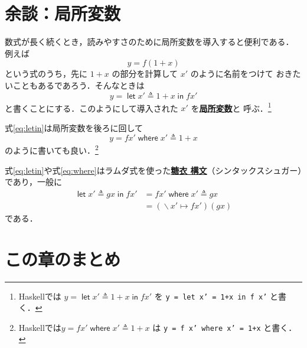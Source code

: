 \documentclass[a5paper,twoside,fleqn,draft]{jsbook}
\newcommand{\programminglanguage}[1]{\textsf{#1}}
\newcommand{\haskell}{\programminglanguage{Haskell}}
\newcommand{\keyword}[1]{{\underline{\textbf{#1}}}}
\newcommand{\code}[1]{\texttt{#1}}
\newcommand{\mKeyword}[1]{\mathsf{#1}}
\newcommand{\mIfKeyword}{\mKeyword{if}}
\newcommand{\mInKeyword}{\mKeyword{in}}
\newcommand{\mLetKeyword}{\mKeyword{let}}
\newcommand{\mOtherwiseKeyword}{\mKeyword{otherwise}}
\newcommand{\mWhereKeyword}{\mKeyword{where}}
\DeclareMathOperator{\mIf}{\mIfKeyword}
\DeclareMathOperator{\mLet}{\mLetKeyword}
\DeclareMathOperator{\mLetIn}{\mInKeyword}
\DeclareMathOperator{\mOtherwise}{\mOtherwiseKeyword}
\DeclareMathOperator{\mWhere}{\mWhereKeyword}
\DeclareMathOperator{\mLambda}{\backslash}
\DeclareMathOperator{\mLambdaArrow}{\mapsto}
\DeclareMathOperator{\mLetEq}{\triangleq}
\DeclareMathOperator{\mWhereEq}{\mLetEq}
\begin{document}

\section{余談：局所変数}

数式が長く続くとき，読みやすさのために局所変数を導入すると便利である．
例えば
\begin{equation}
  y
  =f(1+x)
\end{equation}
という式のうち，先に $1+x$ の部分を計算して $x'$ のように名前をつけて
おきたいこともあるであろう．そんなときは
\begin{equation}
  \label{eq:letin}
  y
  =\mLet x'
  \mLetEq 1+x
  \mLetIn fx'
\end{equation}
と書くことにする．このようにして導入された $x'$ を\keyword{局所変数}と
呼ぶ．\footnote{\haskell では $y=\mLet x'\mLetEq1+x\mLetIn fx'$ を
  \code{y = let x' = 1+x in f x'} と書く．}

式\eqref{eq:letin}は局所変数を後ろに回して
\begin{equation}
  \label{eq:where}
  y=fx'\mWhere x'\mWhereEq 1+x
\end{equation}
のように書いても良い．\footnote{\haskell では$y=fx'\mWhere
  x'\mWhereEq1+x$ は \code{y = f x' where x' = 1+x} と書く．}

式\eqref{eq:letin}や式\eqref{eq:where}はラムダ式を使った\keyword{糖衣
  構文}（シンタックスシュガー）であり，一般に
\begin{align}
  \mLet x'\mLetEq gx\mLetIn fx'
  &=fx'\mWhere x'\mWhereEq gx\\
  &=(\mLambda x'\mLambdaArrow fx')(gx)
\end{align}
である．

\section{この章のまとめ}
\end{document}
